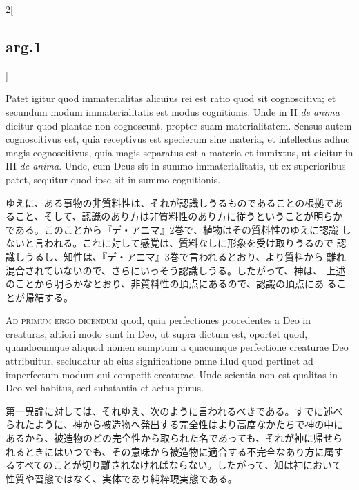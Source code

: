 \documentclass[paper=a4paper,fontsize=10pt,jafontsize=9pt,titlepage]{jlreq}
\begin{document}
\begin{paracol}{2}[\subsection{arg.1}]
\switchcolumn*

Patet igitur quod immaterialitas alicuius rei est ratio quod sit
cognoscitiva; et secundum modum immaterialitatis est modus
cognitionis. Unde in II {\itshape de anima} dicitur quod plantae non
cognoscunt, propter suam materialitatem. Sensus autem cognoscitivus
est, quia receptivus est specierum sine materia, et intellectus adhuc
magis cognoscitivus, quia magis separatus est a materia et immixtus,
ut dicitur in III {\itshape de anima}. Unde, cum Deus sit in summo
immaterialitatis, ut ex superioribus patet, sequitur quod ipse sit in
summo cognitionis.

\switchcolumn

ゆえに、ある事物の非質料性は、それが認識しうるものであることの根拠であ
ること、そして、認識のあり方は非質料性のあり方に従うということが明らか
である。このことから『デ・アニマ』2巻で、植物はその質料性のゆえに認識
しないと言われる。これに対して感覚は、質料なしに形象を受け取りうるので
認識しうるし、知性は、『デ・アニマ』3巻で言われるとおり、より質料から
離れ混合されていないので、さらにいっそう認識しうる。したがって、神は、
上述のことから明らかなとおり、非質料性の頂点にあるので、認識の頂点にあ
ることが帰結する。

\switchcolumn*[\subsection{ad.1}]

{\scshape Ad primum ergo dicendum} quod, quia perfectiones procedentes
a Deo in creaturas, altiori modo sunt in Deo, ut supra dictum est,
oportet quod, quandocumque aliquod nomen sumptum a quacumque
perfectione creaturae Deo attribuitur, secludatur ab eius
significatione omne illud quod pertinet ad imperfectum modum qui
competit creaturae. Unde scientia non est qualitas in Deo vel habitus,
sed substantia et actus purus.

\switchcolumn

第一異論に対しては、それゆえ、次のように言われるべきである。すでに述べ
られたように、神から被造物へ発出する完全性はより高度なかたちで神の中に
あるから、被造物のどの完全性から取られた名であっても、それが神に帰せら
れるときにはいつでも、その意味から被造物に適合する不完全なあり方に属す
るすべてのことが切り離されなければならない。したがって、知は神において
性質や習態ではなく、実体であり純粋現実態である。

\switchcolumn*[\subsection{ad.2}]


\end{paracol}
\end{document}

